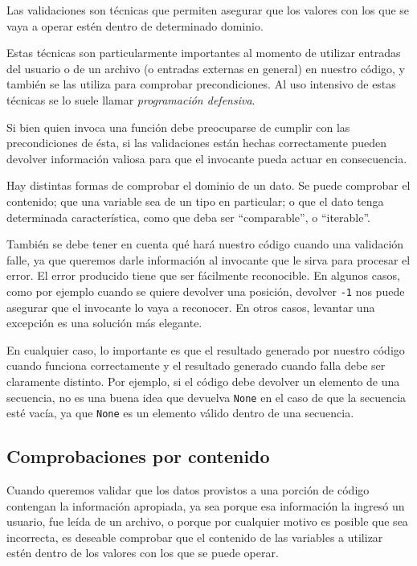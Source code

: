 Las validaciones son técnicas que permiten asegurar que los valores con los
que se vaya a operar estén dentro de determinado dominio.

Estas técnicas son particularmente importantes al momento de utilizar entradas
del usuario o de un archivo (o entradas externas en general) en nuestro
código, y también se las utiliza para comprobar precondiciones. Al
uso intensivo de estas técnicas se lo suele llamar {\it programación
defensiva}.

Si bien quien invoca una función debe preocuparse de cumplir con las
precondiciones de ésta, si las validaciones están hechas correctamente pueden
devolver información valiosa para que el invocante pueda actuar en
consecuencia.

Hay distintas formas de comprobar el dominio de un dato. Se puede comprobar
el contenido; que una variable sea de un tipo en particular; o que el dato
tenga determinada característica, como que deba ser ``comparable'', o
``iterable''.

También se debe tener en cuenta qué hará nuestro código cuando una
validación falle, ya que queremos darle información al invocante que le sirva
para procesar el error. El error producido tiene que ser fácilmente
reconocible.  En algunos casos, como por ejemplo cuando se quiere devolver
una posición, devolver \lstinline!-1! nos puede asegurar que el invocante
lo vaya a reconocer. En otros casos, levantar una excepción es una solución
más elegante.

En cualquier caso, lo importante es que el resultado generado por nuestro
código cuando funciona correctamente y el resultado generado cuando falla
debe ser claramente distinto. Por ejemplo, si el código debe devolver un
elemento de una secuencia, no es una buena idea que devuelva
\lstinline!None! en el caso de que la secuencia esté vacía, ya que
\lstinline!None! es un elemento válido dentro de una secuencia.

\subsection{Comprobaciones por contenido}

Cuando queremos validar que los datos provistos a una porción de código
contengan la información apropiada, ya sea porque esa información la ingresó
un usuario, fue leída de un archivo, o porque por cualquier motivo es posible
que sea incorrecta, es deseable comprobar que el contenido de las variables a
utilizar estén dentro de los valores con los que se puede operar.

